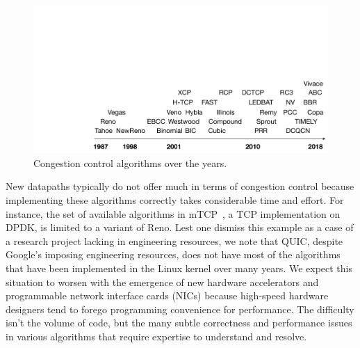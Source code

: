 \begin{figure}[t]
\centering
    \includegraphics[width=\columnwidth]{img/cc-timeline-nocongsig}
    \vspace{-20pt}
    \caption{Congestion control algorithms over the years.}\label{fig:cctimeline}
    \vspace{-15pt}
\end{figure}

New datapaths typically do not offer much in terms of congestion control because implementing these algorithms correctly takes considerable time and effort. For instance, the set of available algorithms in mTCP~\cite{mtcp}, a TCP implementation on DPDK, is limited to a variant of Reno. 
Lest one dismiss this example as a case of a research project lacking in engineering resources, we note that QUIC, despite Google's imposing engineering resources, does not have most of the algorithms that have been implemented in the Linux kernel over many years.  
We expect this situation to worsen with the emergence of new hardware accelerators and programmable network interface cards (NICs) because high-speed hardware designers tend to forego programming convenience for performance. The difficulty isn't the volume of code, but the many subtle correctness and performance issues in various algorithms that require expertise to understand and resolve.

